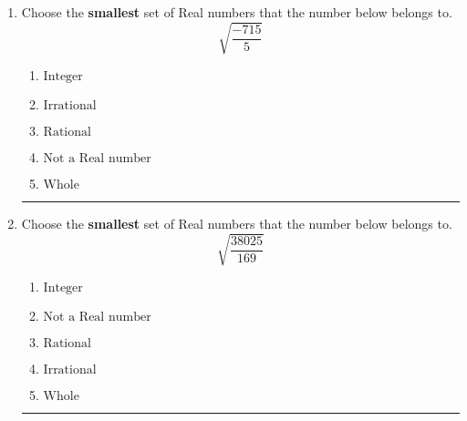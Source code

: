\documentclass[14pt]{extbook}
\newcommand{\litem}[1]{\item#1\hspace*{-1cm}\rule{\textwidth}{0.4pt}}
\begin{document}
\begin{enumerate}
{\begin{enumerate}[label=\Alph*.]
\end{enumerate} }
\litem{
Choose the \textbf{smallest} set of Real numbers that the number below belongs to.\[ \sqrt{\frac{-715}{5}} \]\begin{enumerate}[label=\Alph*.]
\item \( \text{Integer} \)
\item \( \text{Irrational} \)
\item \( \text{Rational} \)
\item \( \text{Not a Real number} \)
\item \( \text{Whole} \)

\end{enumerate} }
\litem{
Choose the \textbf{smallest} set of Real numbers that the number below belongs to.\[ \sqrt{\frac{38025}{169}} \]\begin{enumerate}[label=\Alph*.]
\item \( \text{Integer} \)
\item \( \text{Not a Real number} \)
\item \( \text{Rational} \)
\item \( \text{Irrational} \)
\item \( \text{Whole} \)

\end{enumerate} }
\end{enumerate}
\end{document}
